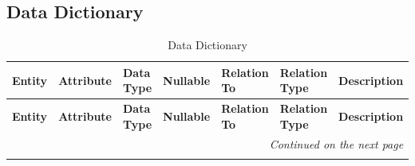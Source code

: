 \documentclass{FastFyp}
\begin{document}
\pagebreak
\subsection{Data Dictionary}

\begin{longtable}{|l|l|l|l|l|l|l|}
\caption{Data Dictionary} \label{tab:Data Dictionary}
\hline
\textbf{Entity} & \textbf{Attribute} & \textbf{Data Type} & \textbf{Nullable} & \textbf{Relation To} & \textbf{Relation Type} & \textbf{Description} \\ 
\hline
\endfirsthead

\hline
\textbf{Entity} & \textbf{Attribute} & \textbf{Data Type} & \textbf{Nullable} & \textbf{Relation To} & \textbf{Relation Type} & \textbf{Description} \\ 
\hline
\endhead

\hline
\multicolumn{7}{r}{\textit{Continued on the next page}} \\ 
\hline
\endfoot

\hline
\endlastfoot


\end{longtable}
\end{document}
